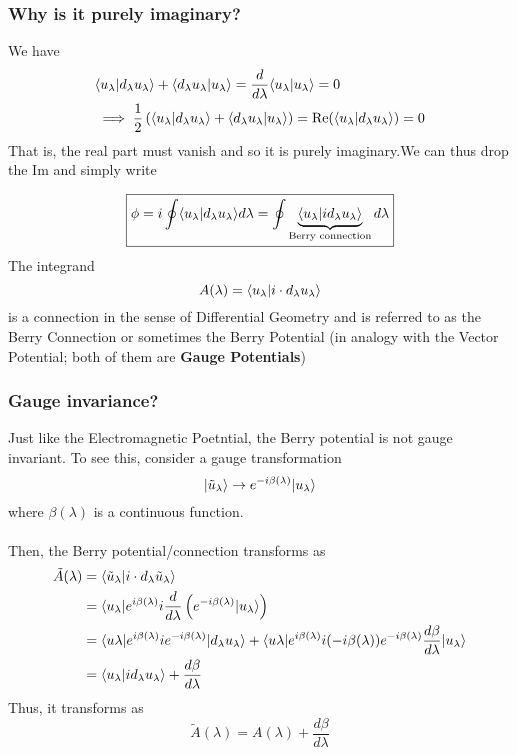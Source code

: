 \documentclass[11pt]{article}
\begin{document}
\subsubsection{Why is it purely imaginary?}
We have 
\begin{align*}
  &\langle u_{\lambda} | d_{\lambda}u_{\lambda} \rangle + \langle d_{\lambda}u_{\lambda} | u_{\lambda} \rangle = \frac{d}{d\lambda} \langle u_{\lambda} | u_{\lambda} \rangle = 0 \\
  &\implies \frac{1}{2} \left(\langle u_{\lambda} | d_{\lambda}u_{\lambda} \rangle + \langle d_{\lambda}u_{\lambda} | u_{\lambda} \rangle\right) = \mathrm{Re}(\langle u_{\lambda} | d_{\lambda}u_{\lambda} \rangle) = 0
\end{align*}
That is, the real part must vanish and so it is purely imaginary.We can thus drop the $\mathrm{Im}$ and simply write

\begin{equation}
\boxed{  \phi = i \oint \langle u_{\lambda} | d_{\lambda}u_{\lambda} \rangle d\lambda = \oint \underbrace{\langle u_{\lambda} | id_{\lambda}u_{\lambda} \rangle}_{\text{Berry connection}}  d\lambda
}\end{equation} The integrand $$ A(\lambda) = \langle u_{\lambda} | i \cdot d_{\lambda} u_{\lambda} \rangle $$ is a connection in the sense of Differential Geometry and is referred to as the Berry Connection or sometimes the Berry Potential (in analogy with the Vector Potential; both of them are \textbf{Gauge Potentials})

\subsubsection{Gauge invariance?}
Just like the Electromagnetic Poetntial, the Berry potential is not gauge invariant. To see this, consider a gauge transformation $$ \lvert\tilde{u}_{\lambda}\rangle \rightarrow e^{-i\beta(\lambda)} \lvert u_{\lambda}\rangle $$ where $\beta(\lambda)$ is a continuous function.
\\
\\
Then, the Berry potential/connection transforms as 
\begin{align*}
  \tilde{A}(\lambda) &= \langle \tilde{u}_{\lambda} | i \cdot d_{\lambda} \tilde{u}_{\lambda} \rangle \\
  &= \langle u_{\lambda}\rvert e^{i\beta(\lambda)} i \frac{d}{d\lambda} \left( e^{-i\beta(\lambda)} \lvert u_{\lambda}\rangle \right) \\
  &= \langle u{\lambda}\rvert e^{i\beta(\lambda)} i e^{-i\beta(\lambda)} \lvert d_{\lambda} u_{\lambda}\rangle + \langle u{\lambda}\rvert e^{i\beta(\lambda)} i (-i\beta(\lambda)) e^{-i\beta(\lambda)} \frac{d\beta}{d\lambda} \lvert u_{\lambda}\rangle \\
  &= \langle u_{\lambda} | id_{\lambda}u_{\lambda} \rangle + \frac{d\beta}{d\lambda}
\end{align*} Thus, it transforms as $$ \tilde{A}(\lambda) = A(\lambda) + \frac{d\beta}{d\lambda} $$ 
\end{document}
